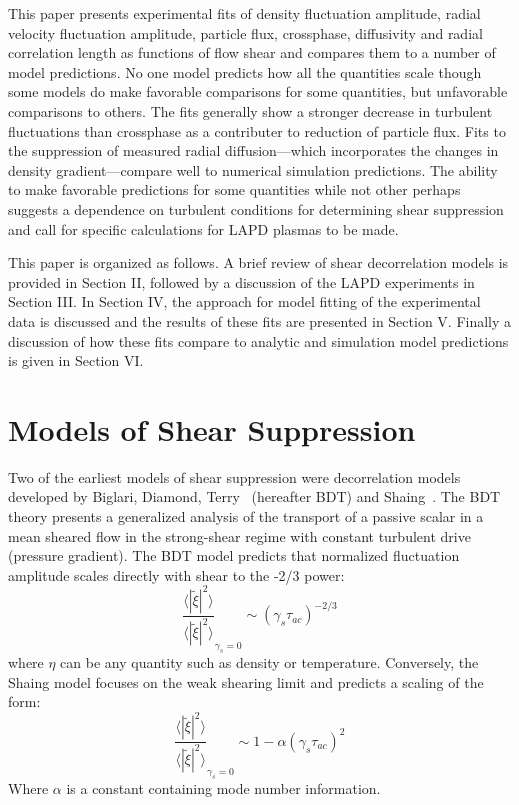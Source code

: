 \documentclass[aip,pop,amsmath,amssymb,reprint,superscriptaddress]{revtex4-1} %
\begin{document}
This paper presents experimental fits of density fluctuation amplitude, radial velocity fluctuation amplitude, particle flux, crossphase, diffusivity and radial correlation length as functions of flow shear and compares them to a number of model predictions. No one model predicts how all the quantities scale though some models do make favorable comparisons for some quantities, but unfavorable comparisons to others. The fits generally show a stronger decrease in turbulent fluctuations than crossphase as a contributer to reduction of particle flux. Fits to the suppression of measured radial diffusion---which incorporates the changes in density gradient---compare well to numerical simulation predictions. The ability to make favorable predictions for some quantities while not other perhaps suggests a dependence on turbulent conditions for determining shear suppression and call for specific calculations for LAPD plasmas to be made.

This paper is organized as follows.  A brief review of shear decorrelation models is provided in Section II, followed by a discussion of the LAPD experiments in Section III. In Section IV, the approach for model fitting of the experimental data is discussed and the results of these fits are presented in Section V. Finally a discussion of how these fits compare to analytic and simulation model predictions is given in Section VI.

\section{Models of Shear Suppression}

Two of the earliest models of shear suppression were decorrelation models developed by Biglari, Diamond, Terry~\cite{biglari90} (hereafter BDT) and Shaing~\cite{shaing90}. The BDT theory presents a generalized analysis of the transport of a passive scalar in a mean sheared flow in the strong-shear regime with constant turbulent drive (pressure gradient). The BDT model predicts that normalized fluctuation amplitude scales directly with shear to the -2/3 power:
%
\begin{equation}
\frac{\langle |\tilde{\xi}|^{2} \rangle}{\langle |\tilde{\xi}|^{2} \rangle}_{\gamma_{s}=0} \sim (\gamma_{s}\tau_{ac})^{-2/3}
\label{eq:BDT_theory}
\end{equation}
%
where $\eta$ can be any quantity such as density or temperature. Conversely, the Shaing model focuses on the weak shearing limit and predicts a scaling of the form:
%
\begin{equation}
\frac{\langle |\tilde{\xi}|^{2} \rangle}{\langle |\tilde{\xi}|^{2} \rangle}_{\gamma_{s}=0} \sim 1- \alpha(\gamma_{s}\tau_{ac})^2
\label{eq:shaing_theory}
\end{equation}
%
Where $\alpha$ is a constant containing mode number information. 
\end{document}

